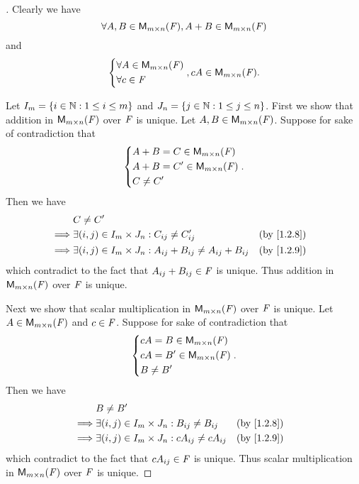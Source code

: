 \begin{proof}[]
	Clearly we have
	\[
		\forall A, B \in \mathsf{M}_{{m} \times n}({\mathit{F}}), A + B \in \mathsf{M}_{{m} \times n}({\mathit{F}})
	\]
	and
	\[
		\begin{dcases}
			\forall A \in \mathsf{M}_{{m} \times n}({\mathit{F}}) \\
			\forall c \in \mathit{F}
		\end{dcases}, cA \in \mathsf{M}_{{m} \times n}({\mathit{F}}).
	\]

	Let \(I_m = \left\lbrace i \in \mathbb{N} : 1 \leq i \leq m\right\rbrace\) and \(J_n = \left\lbrace j \in \mathbb{N} : 1 \leq j \leq n\right\rbrace\).
	First we show that addition in \(\mathsf{M}_{{m} \times n}({\mathit{F}})\) over \(\mathit{F}\) is unique.
	Let \(A, B \in \mathsf{M}_{{m} \times n}({\mathit{F}})\).
	Suppose for sake of contradiction that
	\[
		\begin{dcases}
			A + B = C \in \mathsf{M}_{{m} \times n}({\mathit{F}})  \\
			A + B = C' \in \mathsf{M}_{{m} \times n}({\mathit{F}}) \\
			C \neq C'
		\end{dcases}.
	\]
	Then we have
	\begin{align*}
		         & C \neq C'                                                                                                   \\
		\implies & \exists (i, j) \in I_m \times J_n :  C_{i j} \neq C_{i j}'                    &  & \text{(by \cref{1.2.8})} \\
		\implies & \exists (i, j) \in I_m \times J_n :  A_{i j} + B_{i j} \neq A_{i j} + B_{i j} &  & \text{(by \cref{1.2.9})}
	\end{align*}
	which contradict to the fact that \(A_{i j} + B_{i j} \in \mathit{F}\) is unique.
	Thus addition in \(\mathsf{M}_{{m} \times n}({\mathit{F}})\) over \(\mathit{F}\) is unique.

	Next we show that scalar multiplication in \(\mathsf{M}_{{m} \times n}({\mathit{F}})\) over \(\mathit{F}\) is unique.
	Let \(A \in \mathsf{M}_{{m} \times n}({\mathit{F}})\) and \(c \in \mathit{F}\).
	Suppose for sake of contradiction that
	\[
		\begin{dcases}
			cA = B \in \mathsf{M}_{{m} \times n}({\mathit{F}})  \\
			cA = B' \in \mathsf{M}_{{m} \times n}({\mathit{F}}) \\
			B \neq B'
		\end{dcases}.
	\]
	Then we have
	\begin{align*}
		         & B \neq B'                                                                                  \\
		\implies & \exists (i, j) \in I_m \times J_n : B_{i j} \neq B_{i j}     &  & \text{(by \cref{1.2.8})} \\
		\implies & \exists (i, j) \in I_m \times J_n : c A_{i j} \neq c A_{i j} &  & \text{(by \cref{1.2.9})}
	\end{align*}
	which contradict to the fact that \(c A_{i j} \in \mathit{F}\) is unique.
	Thus scalar multiplication in \(\mathsf{M}_{{m} \times n}({\mathit{F}})\) over \(\mathit{F}\) is unique.


\end{proof}
